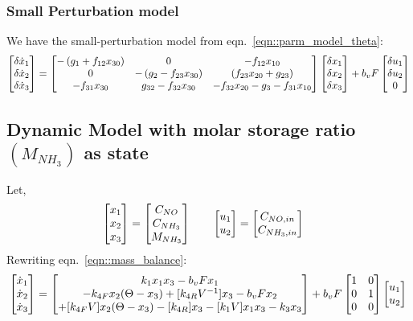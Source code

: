 \subsubsection{Small Perturbation model}
We have the small-perturbation model from eqn.~\ref{eqn::parm_model_theta}:
\begin{equation}\label{eqn::sml_ptrb_theta}
     \begin{bmatrix} \delta \dot x_1 \\
        \delta \dot x_2\\
        \delta \dot x_3\\
         \end{bmatrix} =
    \begin{bmatrix} 
        -\left( g_1 + f_{12} x_{30} \right) &
        0                                  &
        -f_{12} x_{10}
        \\
        0 &
        -\left( g_2 - f_{23} x_{30} \right) &
        \left( f_{23} x_{20}+ g_{23} \right)
        \\
        -f_{31} x_{30}  &
        g_{32} - f_{32} x_{30}&
        -f_{32} x_{20} - g_3 - f_{31} x_{10}
     \end{bmatrix}
    \begin{bmatrix} \delta x_1\\
        \delta x_2\\
        \delta x_3\\
         \end{bmatrix}
    + b_v F \begin{bmatrix} \delta u_1 \\ \delta u_2 \\ 0 \end{bmatrix}
\end{equation}



\subsection{Dynamic Model with molar storage ratio $(M_{NH_3})$ as state}
Let,
\begin{align*}
    \begin{bmatrix} x_1 \\ x_2 \\ x_3 \end{bmatrix} = \begin{bmatrix} C_{NO} \\ C_{NH_3} \\ M_{NH_3} \end{bmatrix} \qquad &
    \begin{bmatrix} u_1 \\ u_2  \end{bmatrix} = \begin{bmatrix} C_{NO, in} \\ C_{NH_3, in} \end{bmatrix}
\end{align*}
Rewriting eqn.~\ref{eqn::mass_balance}:
\begin{equation}\label{eqn::3_state_M}
    \begin{bmatrix} \dot x_1 \\ \dot x_2 \\ \dot x_3 \end{bmatrix} =
    \begin{bmatrix} k_1 x_1 x_3 - b_v F x_1 \\
        -k_{4F}  x_2 (\Theta-x_3) + [k_{4R} V^{-1}] x_3 - b_vF x_2 \\
        +[k_{4F}V] x_2 (\Theta-x_3) - [k_{4R}] x_3 - [k_1V] x_1 x_3 - k_3 x_3 \end{bmatrix} +
    b_v F \begin{bmatrix} 1 & 0 \\ 0 & 1 \\ 0 & 0 \end{bmatrix} \begin{bmatrix} u_1 \\ u_2 \end{bmatrix}\\
\end{equation}

